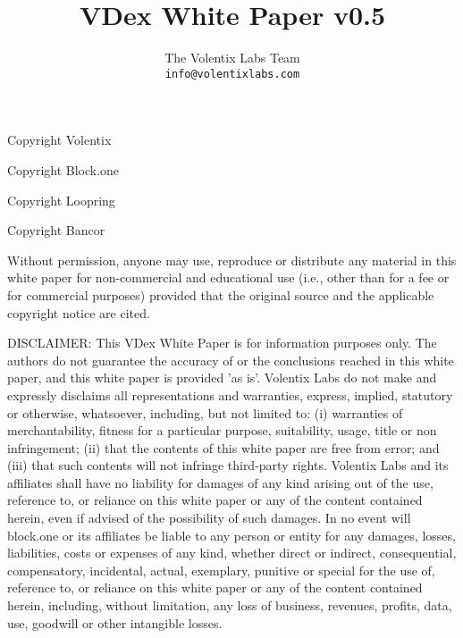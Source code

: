 \documentclass[]{article}
\title{VDex White Paper v0.5}
\author{
		The Volentix Labs Team\\
	\texttt{info@volentixlabs.com}
}
\begin{document}
\tableofcontents
\maketitle
\begin{description}
\item Copyright  Volentix
\item Copyright  Block.one
\item Copyright  Loopring
\item Copyright  Bancor
\end{description}

{\tiny Without permission, anyone may use, reproduce or distribute any material in this white paper for non-commercial and educational use (i.e., other than for a fee or for commercial purposes) provided that the original source and the applicable copyright notice are cited.

DISCLAIMER: This VDex White Paper  is for information purposes only. The authors do not guarantee the accuracy of or the conclusions reached in this white paper, and this white paper is provided 'as is'. 
Volentix Labs do not make and expressly disclaims all representations and warranties, express, implied, statutory or otherwise, whatsoever, including, but not limited to: (i) warranties of merchantability, fitness for a particular purpose, suitability, usage, title or non infringement; (ii) that the contents of this white paper are free from error; and (iii) that such contents will not infringe third-party rights. Volentix Labs and its affiliates shall have no liability for damages of any kind arising out of the use, reference to, or reliance on this white paper or any of the content contained herein, even if advised of the possibility of such damages. In no event will block.one or its affiliates be liable to any person or entity for any damages, losses, liabilities, costs or expenses of any kind, whether direct or indirect, consequential, compensatory, incidental, actual, exemplary, punitive or special for the use of, reference to, or reliance on this white paper or any of the content contained herein, including, without limitation, any loss of business, revenues, profits, data, use, goodwill or other intangible losses.}

\end{document}
